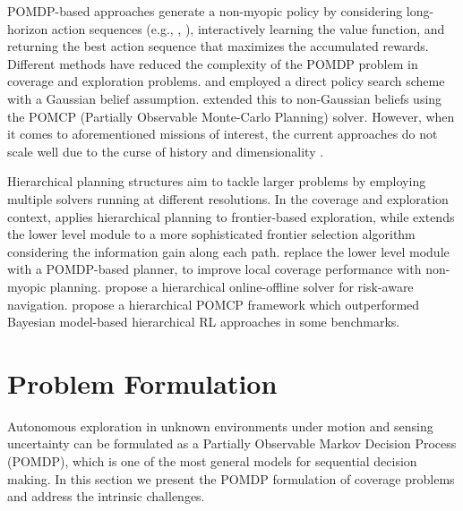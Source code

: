\documentclass[letterpaper]{article} %
\newcommand{\phdone}[1]{} %
\begin{document}
\phdone{Coverage--(Model-based RL) POMDP approaches}
POMDP-based approaches generate a non-myopic policy by considering long-horizon action sequences (e.g., \cite{kurniawati2011motion}, \cite{bai2015intention}), interactively learning the value function, and returning the best action sequence that maximizes the accumulated rewards. Different methods have reduced the complexity of the POMDP problem in coverage and exploration problems. \citet{indelman2015planning} and \citet{martinez2009bayesian} employed a direct policy search scheme with a Gaussian belief assumption. \citet{Lauri2016planning} extended this to non-Gaussian beliefs using the POMCP (Partially Observable Monte-Carlo Planning) solver. %
However, when it comes to aforementioned missions of interest, the current approaches do not scale well due to the curse of history and dimensionality \cite{Pineau03}.

\phdone{Large scale--Hierarchical approaches}
Hierarchical planning structures \cite{kaelbling2011planning} aim to tackle larger problems by employing multiple solvers running at different resolutions.  
%
In the coverage and exploration context, \citet{umari2017autonomous} applies hierarchical planning to frontier-based exploration, while  \cite{dang2019explore} extends the lower level module to a more sophisticated frontier selection algorithm considering the information gain along each path. \citet{Lauri2016planning} replace the lower level module with a POMDP-based planner, to improve local coverage performance with non-myopic planning. \citet{kim2019bi} propose a hierarchical online-offline solver for risk-aware navigation. \citet{vien2015hierarchical} propose a hierarchical POMCP framework which outperformed Bayesian model-based hierarchical RL approaches in some benchmarks.


\section{Problem Formulation}
\label{sec:formulation}

Autonomous exploration in unknown environments under motion and sensing uncertainty can be formulated as a Partially Observable Markov Decision Process (POMDP), which is one of the most general models for sequential decision making.
In this section we present the POMDP formulation of coverage problems and address the intrinsic challenges.
\end{document}
